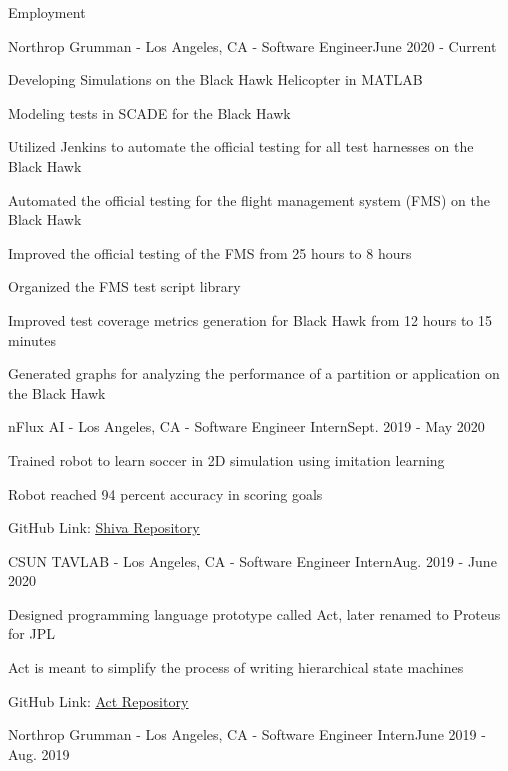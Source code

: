 \documentclass{resume}
\begin{document}
\begin{rSection}{Employment}
    \begin{rSubsection}{Northrop Grumman - Los Angeles, CA - Software Engineer}{June 2020 - Current}{}{}
        \item Developing Simulations on the Black Hawk Helicopter in MATLAB
        \item Modeling tests in SCADE for the Black Hawk
        \item Utilized Jenkins to automate the official testing for all test harnesses on the Black Hawk
        \item Automated the official testing for the flight management system (FMS) on the Black Hawk
        \item Improved the official testing of the FMS from 25 hours to 8 hours
        \item Organized the FMS test script library
        \item Improved test coverage metrics generation for Black Hawk from 12 hours to 15 minutes
        \item Generated graphs for analyzing the performance of a partition or application on the Black Hawk
    \end{rSubsection}
    \begin{rSubsection}{nFlux AI - Los Angeles, CA - Software Engineer Intern}{Sept. 2019 - May 2020}{}{}
        \item Trained robot to learn soccer in 2D simulation using imitation learning
        \item Robot reached 94 percent accuracy in scoring goals
        \item GitHub Link: \href{https://github.com/nflux/Shiva}{\color{blue}\underline{Shiva Repository}}
    \end{rSubsection}
    \begin{rSubsection}{CSUN TAVLAB - Los Angeles, CA - Software Engineer Intern}{Aug. 2019 - June 2020}{}{}
        \item Designed programming language prototype called Act, later renamed to Proteus for JPL
        \item Act is meant to simplify the process of writing hierarchical state machines
        \item GitHub Link: \href{https://github.com/csun-comp430-s20/act}{\color{blue}\underline{Act Repository}}
    \end{rSubsection}
    \begin{rSubsection}{Northrop Grumman - Los Angeles, CA - Software Engineer Intern}{June 2019 - Aug. 2019}{}{}

\end{rSubsection}
\end{rSection}
\end{document}
